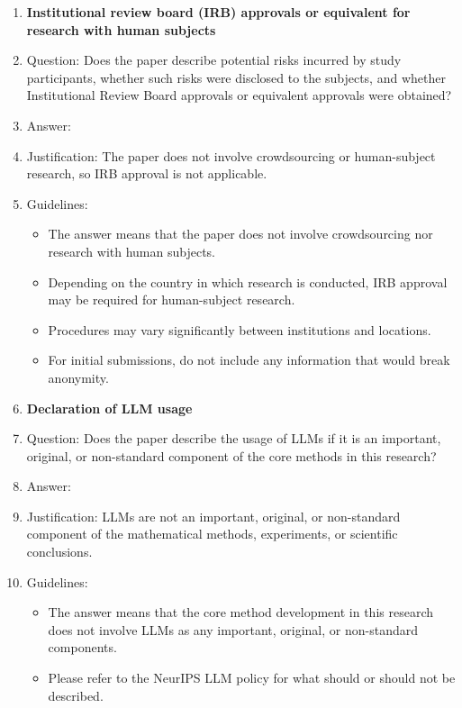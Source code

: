 \documentclass{article}
\begin{document}
\begin{enumerate}[leftmargin=1.5em]
\item {\bf Institutional review board (IRB) approvals or equivalent for research with human subjects}
    \item[] Question: Does the paper describe potential risks incurred by study participants, whether such risks were disclosed to the subjects, and whether Institutional Review Board approvals or equivalent approvals were obtained?
    \item[] Answer: \answerNA{}
    \item[] Justification: The paper does not involve crowdsourcing or human-subject research, so IRB approval is not applicable.
    \item[] Guidelines:
    \begin{itemize}
        \item The answer \answerNA{} means that the paper does not involve crowdsourcing nor research with human subjects.
        \item Depending on the country in which research is conducted, IRB approval may be required for human-subject research.
        \item Procedures may vary significantly between institutions and locations.
        \item For initial submissions, do not include any information that would break anonymity.
    \end{itemize}

\item {\bf Declaration of LLM usage}
    \item[] Question: Does the paper describe the usage of LLMs if it is an important, original, or non-standard component of the core methods in this research?
    \item[] Answer: \answerNA{}
    \item[] Justification: LLMs are not an important, original, or non-standard component of the mathematical methods, experiments, or scientific conclusions.
    \item[] Guidelines:
    \begin{itemize}
        \item The answer \answerNA{} means that the core method development in this research does not involve LLMs as any important, original, or non-standard components.
        \item Please refer to the NeurIPS LLM policy for what should or should not be described.
    \end{itemize}

\end{enumerate}
\end{document}

